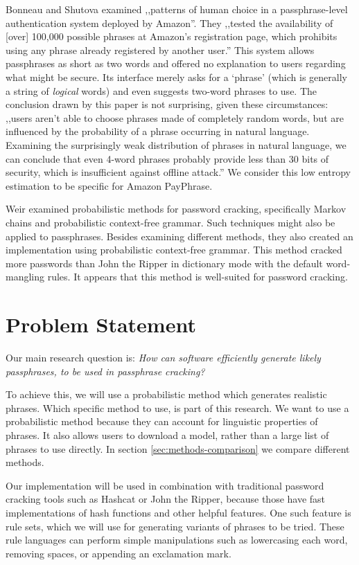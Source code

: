 \documentclass{article}
\begin{document}
Bonneau and Shutova\cite{payphrase-properties} examined ,,patterns of human
choice in a passphrase-level authentication system deployed by Amazon''. They
,,tested the availability of [over] 100,000 possible phrases at Amazon's
registration page, which prohibits using any phrase already registered by
another user.'' This system allows passphrases as short as two words and
offered no explanation to users regarding what might be secure. Its interface
merely asks for a `phrase' (which is generally a string of {\it logical} words)
and even suggests two-word phrases to use. The conclusion drawn by this paper
is not surprising, given these circumstances: ,,users aren't able to choose
phrases made of completely random words, but are influenced by the probability
of a phrase occurring in natural language. Examining the surprisingly weak
distribution of phrases in natural language, we can conclude that even 4-word
phrases probably provide less than 30 bits of security, which is insufficient
against offline attack.'' We consider this low entropy estimation to be
specific for Amazon PayPhrase.

Weir\cite{weir} examined probabilistic methods for password cracking,
specifically Markov chains and probabilistic context-free grammar. Such
techniques might also be applied to passphrases. Besides examining different
methods, they also created an implementation using probabilistic context-free
grammar. This method cracked more passwords than John the Ripper in dictionary
mode with the default word-mangling rules. It appears that this method is
well-suited for password cracking.


\section{Problem Statement}\label{sec:problemstatement}

Our main research question is: {\it How can software efficiently generate
likely passphrases, to be used in passphrase cracking?}

To achieve this, we will use a probabilistic method which generates realistic
phrases. Which specific method to use, is part of this research. We want to use
a probabilistic method because they can account for linguistic properties of
phrases. It also allows users to download a model, rather than a large list of
phrases to use directly. In section \ref{sec:methods-comparison} we compare
different methods.

Our implementation will be used in combination with traditional password
cracking tools such as Hashcat or John the Ripper, because those have fast
implementations of hash functions and other helpful features. One such feature
is rule sets, which we will use for generating variants of phrases to be tried.
These rule languages can perform simple manipulations such as lowercasing each
word, removing spaces, or appending an exclamation mark.
\end{document}
